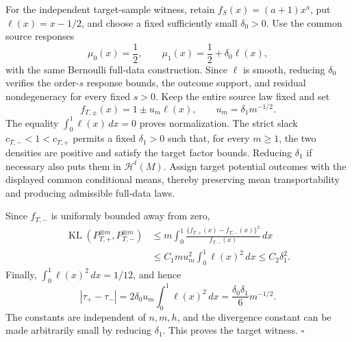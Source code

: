 For the independent target-sample witness, retain
\(f_S(x)=(a+1)x^a\), put \(\ell(x)=x-1/2\), and choose a fixed sufficiently small \(\delta_0>0\).  Use the common source responses
\[
 \mu_0(x)=\frac12,
 \qquad
 \mu_1(x)=\frac12+\delta_0\ell(x),
\]
with the same Bernoulli full-data construction.  Since \(\ell\) is smooth, reducing \(\delta_0\) verifies the order-\(s\) response bounds, the outcome support, and residual nondegeneracy for every fixed \(s>0\).  Keep the entire source law fixed and set
\[
 f_{T,\pm}(x)=1\pm u_m\ell(x),
 \qquad u_m=\delta_1m^{-1/2}.
\]
The equality \(\int_0^1\ell(x)\,dx=0\) proves normalization.  The strict slack
\(c_{T,-}<1<c_{T,+}\) permits a fixed \(\delta_1>0\) such that, for every \(m\ge1\), the two densities are positive and satisfy the target factor bounds.  Reducing \(\delta_1\) if necessary also puts them in \(\mathcal H^t(M)\).  Assign target potential outcomes with the displayed common conditional means, thereby preserving mean transportability and producing admissible full-data laws.

Since \(f_{T,-}\) is uniformly bounded away from zero,
\[
\begin{aligned}
 \operatorname{KL}(P_{T,+}^{\otimes m},P_{T,-}^{\otimes m})
 &\le m\int_0^1
 \frac{\{f_{T,+}(x)-f_{T,-}(x)\}^2}{f_{T,-}(x)}\,dx\\
 &\le C_1mu_m^2\int_0^1\ell(x)^2\,dx
 \le C_2\delta_1^2.
\end{aligned}
\]
Finally, \(\int_0^1\ell(x)^2\,dx=1/12\), and hence
\[
 \left|\tau_+-\tau_-\right|
 =2\delta_0u_m\int_0^1\ell(x)^2\,dx
 =\frac{\delta_0\delta_1}{6}m^{-1/2}.
\]
The constants are independent of \(n,m,h\), and the divergence constant can be made arbitrarily small by reducing \(\delta_1\).  This proves the target witness. \(\square\)